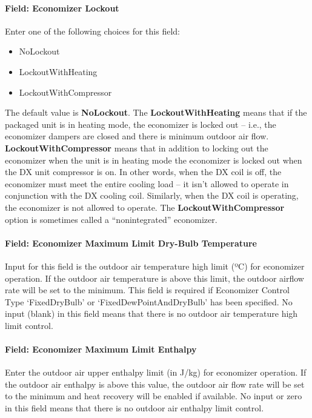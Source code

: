 \paragraph{Field: Economizer Lockout}\label{field-economizer-lockout-1-000}

Enter one of the following choices for this field:

\begin{itemize}
\item
  NoLockout
\item
  LockoutWithHeating
\item
  LockoutWithCompressor
\end{itemize}

The default value is \textbf{NoLockout}. The \textbf{LockoutWithHeating} means that if the packaged unit is in heating mode, the economizer is locked out -- i.e., the economizer dampers are closed and there is minimum outdoor air flow. \textbf{LockoutWithCompressor} means that in addition to locking out the economizer when the unit is in heating mode the economizer is locked out when the DX unit compressor is on. In other words, when the DX coil is off, the economizer must meet the entire cooling load -- it isn't allowed to operate in conjunction with the DX cooling coil. Similarly, when the DX coil is operating, the economizer is not allowed to operate. The \textbf{LockoutWithCompressor} option is sometimes called a ``nonintegrated'' economizer.

\paragraph{Field: Economizer Maximum Limit Dry-Bulb Temperature}\label{field-economizer-maximum-limit-dry-bulb-temperature-000}

Input for this field is the outdoor air temperature high limit (ºC) for economizer operation. If the outdoor air temperature is above this limit, the outdoor airflow rate will be set to the minimum. This field is required if Economizer Control Type `FixedDryBulb' or `FixedDewPointAndDryBulb' has been specified. No input (blank) in this field means that there is no outdoor air temperature high limit control.

\paragraph{Field: Economizer Maximum Limit Enthalpy}\label{field-economizer-maximum-limit-enthalpy-000}

Enter the outdoor air upper enthalpy limit (in J/kg) for economizer operation. If the outdoor air enthalpy is above this value, the outdoor air flow rate will be set to the minimum and heat recovery will be enabled if available. No input or zero in this field means that there is no outdoor air enthalpy limit control.

